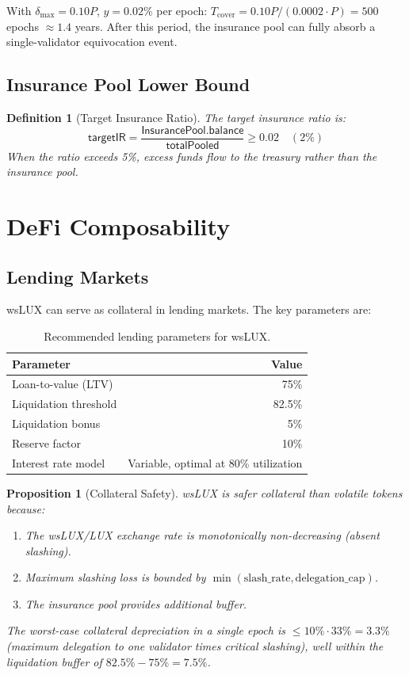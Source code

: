 \documentclass[11pt,a4paper]{article}
\newtheorem{proposition}[theorem]{Proposition}
\newtheorem{definition}{Definition}
\begin{document}
With $\delta_{\max} = 0.10P$, $y = 0.02\%$ per epoch: $T_{\text{cover}} = 0.10P / (0.0002 \cdot P) = 500$ epochs $\approx 1.4$ years. After this period, the insurance pool can fully absorb a single-validator equivocation event.

\subsection{Insurance Pool Lower Bound}

\begin{definition}[Target Insurance Ratio]
The target insurance ratio is:
\begin{equation}
    \mathsf{targetIR} = \frac{\mathsf{InsurancePool.balance}}{\mathsf{totalPooled}} \geq 0.02 \quad (2\%)
\end{equation}
When the ratio exceeds 5\%, excess funds flow to the treasury rather than the insurance pool.
\end{definition}

\section{DeFi Composability}\label{sec:defi}

\subsection{Lending Markets}

wsLUX can serve as collateral in lending markets. The key parameters are:

\begin{table}[H]
\centering
\caption{Recommended lending parameters for wsLUX.}
\label{tab:lending}
\begin{tabular}{lr}
\toprule
\textbf{Parameter} & \textbf{Value} \\
\midrule
Loan-to-value (LTV) & 75\% \\
Liquidation threshold & 82.5\% \\
Liquidation bonus & 5\% \\
Reserve factor & 10\% \\
Interest rate model & Variable, optimal at 80\% utilization \\
\bottomrule
\end{tabular}
\end{table}

\begin{proposition}[Collateral Safety]
wsLUX is safer collateral than volatile tokens because:
\begin{enumerate}
    \item The wsLUX/LUX exchange rate is monotonically non-decreasing (absent slashing).
    \item Maximum slashing loss is bounded by $\min(\text{slash\_rate}, \text{delegation\_cap})$.
    \item The insurance pool provides additional buffer.
\end{enumerate}
The worst-case collateral depreciation in a single epoch is $\leq 10\% \cdot 33\% = 3.3\%$ (maximum delegation to one validator times critical slashing), well within the liquidation buffer of $82.5\% - 75\% = 7.5\%$.
\end{proposition}
\end{document}
